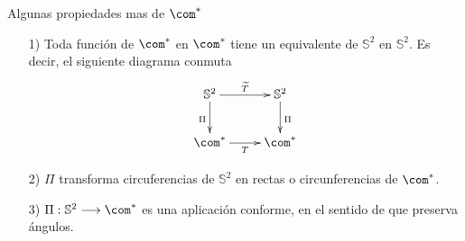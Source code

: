 Algunas propiedades mas de $\com^*$
\begin{enumerate}
    \item[1)] Toda función de $\com^*$ en $\com^*$ tiene un equivalente de $\mathbb{S}^2$ en $\mathbb{S}^2$. Es decir, el siguiente diagrama conmuta
    \begin{align*}
        \xymatrix{
        \mathbb{S}^2 \ar[d]_{\Pi} \ar[r]^{\widetilde{T}} & \mathbb{S}^2 \ar[d]^{\Pi} \\
        \com^* \ar[r]_{T} & \com^*
        }
    \end{align*}
    \item[2)] $\Pi$ transforma circuferencias de $\mathbb{S}^2$ en rectas o circunferencias de $\com^*$.
    \item[3)] $\Pi : \mathbb{S}^2 \longrightarrow \com^*$ es una aplicación conforme, en el sentido de que preserva ángulos.
\end{enumerate}
